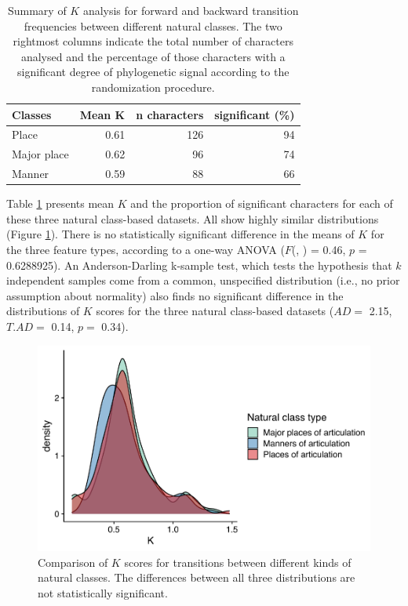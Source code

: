 \begin{table}

\caption{\label{tab:k-natural-classes-summary}Summary of $K$ analysis for forward and backward transition frequencies between different natural classes. The two rightmost columns indicate the total number of characters analysed and the percentage of those characters with a significant degree of phylogenetic signal according to the randomization procedure.}
\centering
\begin{tabular}[t]{lrrr}
\toprule
Classes & Mean K & n characters & significant (\%)\\
\midrule
Place & 0.61 & 126 & 94\\
Major place & 0.62 & 96 & 74\\
Manner & 0.59 & 88 & 66\\
\bottomrule
\end{tabular}
\end{table}

Table \ref{tab:k-natural-classes-summary} presents mean \(K\) and the proportion of significant characters for each of these three natural class-based datasets. All show highly similar distributions (Figure \ref{fig:k-natural-classes}). There is no statistically significant difference in the means of \(K\) for the three feature types, according to a one-way ANOVA (\(F\)(, ) = 0.46, \(p\) = 0.6288925). An Anderson-Darling k-sample test, which tests the hypothesis that \(k\) independent samples come from a common, unspecified distribution (i.e., no prior assumption about normality) also finds no significant difference in the distributions of \(K\) scores for the three natural class-based datasets (\(AD=\) 2.15, \(T.AD=\) 0.14, \(p=\) 0.34).

\begin{figure}

{\centering \includegraphics[width=0.66\linewidth]{05-phylo-signal/fig/k-natural-classes} 

}

\caption{Comparison of $K$ scores for transitions between different kinds of natural classes. The differences between all three distributions are not statistically significant.}\label{fig:k-natural-classes}
\end{figure}

